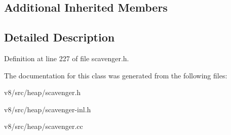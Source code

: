 \subsection*{Additional Inherited Members}


\subsection{Detailed Description}


Definition at line 227 of file scavenger.\+h.



The documentation for this class was generated from the following files\+:\begin{DoxyCompactItemize}
\item 
v8/src/heap/scavenger.\+h\item 
v8/src/heap/scavenger-\/inl.\+h\item 
v8/src/heap/scavenger.\+cc\end{DoxyCompactItemize}
